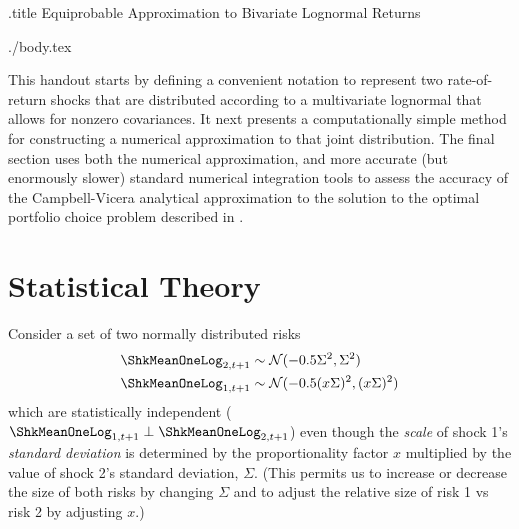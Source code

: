 \documentclass{handout}
\begin{document}
\large

\handoutHeader

\begin{verbatimwrite}{\jobname.title}
Equiprobable Approximation to Bivariate Lognormal Returns
\end{verbatimwrite}

\handoutNameMake


\begin{verbatimwrite}{./body.tex}
  \newcommand{\sigAll}{\Sigma} %
  
\newcommand{\scale}{x}

This handout starts by defining a convenient notation to represent two rate-of-return shocks
that are distributed according to a multivariate lognormal that allows
for nonzero covariances.  It next presents a computationally
simple method for constructing a numerical approximation to that joint distribution.  The final
section uses both the numerical approximation, and more accurate (but enormously slower) standard numerical integration tools to assess the accuracy of the Campbell-Vicera analytical approximation to the solution to the optimal portfolio choice problem
described in .  

\section{Statistical Theory}

Consider a set of two normally distributed risks
\begin{equation*}\begin{gathered}\begin{aligned}
   \ShkMeanOneLog_{2,t+1} & \sim  \mathcal{N}(-0.5 \sigAll^{2},\sigAll^{2})
\\ \ShkMeanOneLog_{1,t+1} & \sim  \mathcal{N}(-0.5 (\scale \sigAll)^{2},(\scale \sigAll)^{2})
\end{aligned}\end{gathered}\end{equation*}
which are statistically independent ($\ShkMeanOneLog_{1,t+1} \perp \ShkMeanOneLog_{2,t+1}$) even though the {\it scale} of shock 1's
{\it standard deviation} is determined by the proportionality factor
$\scale$ multiplied by the value of shock 2's standard deviation,
$\sigAll$.  (This permits us to increase or decrease the size of both risks
by changing $\sigAll$ and to adjust the relative size of risk 1 vs risk 2 by adjusting $\scale$.)


\end{verbatimwrite}
\end{document}
